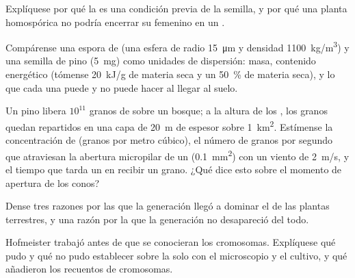 \begin{exercise}[$\star\star$]\label{exo:b2:plant-life-cycles:8}
Explíquese por qué la  es una condición previa de la semilla,
y por qué una planta homospórica no podría encerrar su 
femenino en un .
\end{exercise}

\begin{exercise}[$\star\star$]\label{exo:b2:plant-life-cycles:9}
Compárense una espora de  (una esfera de radio \qty{15}{\micro m}
y densidad \qty{1100}{kg/m^3}) y una semilla de pino (\qty{5}{mg}) como
unidades de dispersión: masa, contenido energético (tómense
\qty{20}{kJ/g} de materia seca y un \qty{50}{\%} de materia seca), y lo
que cada una puede y no puede hacer al llegar al suelo.
\end{exercise}

\begin{exercise}[$\star\star\star$]\label{exo:b2:plant-life-cycles:10}
Un pino libera $10^{11}$ granos de  sobre un bosque; a la altura de
los , los granos quedan repartidos en una capa de \qty{20}{m} de
espesor sobre \qty{1}{km^2}. Estímense la concentración de  (granos
por metro cúbico), el número de granos por segundo que atraviesan la
abertura micropilar de un  (\qty{0.1}{mm^2}) con un viento de
\qty{2}{m/s}, y el tiempo que tarda un  en recibir un grano. ¿Qué
dice esto sobre el momento de apertura de los conos?
\end{exercise}

\begin{exercise}[$\star\star\star$]\label{exo:b2:plant-life-cycles:11}
Dense tres razones por las que la generación  llegó a dominar el
 de las plantas terrestres, y una razón por la que la
generación  no desapareció del todo.
\end{exercise}

\begin{exercise}[$\star\star\star$]\label{exo:b2:plant-life-cycles:12}
Hofmeister trabajó antes de que se conocieran los cromosomas. Explíquese
qué pudo y qué no pudo establecer sobre la 
solo con el microscopio y el cultivo, y qué añadieron los recuentos de
cromosomas.
\end{exercise}

